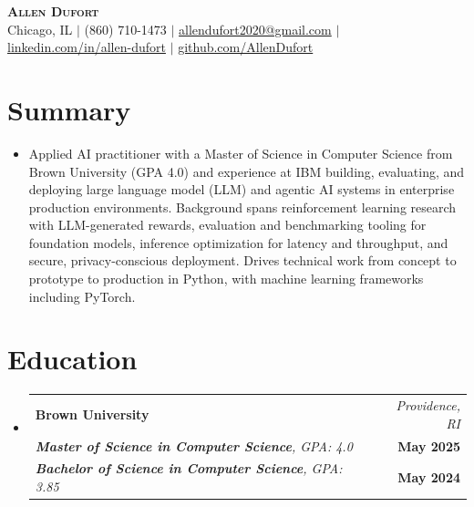 \documentclass[letterpaper,10pt]{article}
\makeatletter
\newcommand{\resumeEdHeading}[6]{
  \item
  \begin{tabular*}{\textwidth}{l@{\extracolsep{\fill}}r}
    \textbf{#1} & \textit{\small #2} \\
    \textit{#3} & \textbf{\small #4} \\
    \textit{#5} & \textbf{\small #6} \\
  \end{tabular*}\vspace{-7pt}
}
\newcommand{\resumeSubHeadingListStart}{\begin{itemize}[leftmargin=0in, label={}]}
\newcommand{\resumeSubHeadingListEnd}{\end{itemize}}
\newcommand{\resumeItemListStart}{\begin{itemize}}
\newcommand{\resumeItemListEnd}{\end{itemize}\vspace{-5pt}}
\makeatother
\begin{document}
\begin{center}
  \textbf{\Huge \scshape Allen Dufort} \\ \vspace{6pt}
  \small
  Chicago, IL $|$
  (860) 710-1473 $|$
  \href{mailto:allendufort2020@gmail.com}{allendufort2020@gmail.com} $|$
  \href{https://www.linkedin.com/in/allen-dufort/}{linkedin.com/in/allen-dufort} $|$
  \href{https://github.com/AllenDufort}{github.com/AllenDufort}
\end{center}

\section{Summary}
\resumeItemListStart[leftmargin=0in, label={}]
  \item\small{
    Applied AI practitioner with a Master of Science in Computer Science from Brown University (GPA 4.0) and experience at IBM building, evaluating, and deploying large language model (LLM) and agentic AI systems in enterprise production environments. Background spans reinforcement learning research with LLM-generated rewards, evaluation and benchmarking tooling for foundation models, inference optimization for latency and throughput, and secure, privacy-conscious deployment. Drives technical work from concept to prototype to production in Python, with machine learning frameworks including PyTorch.
  }
\resumeItemListEnd

\section{Education}
\resumeSubHeadingListStart
  \resumeEdHeading
    {Brown University}{Providence, RI}
    {\textbf{Master of Science in Computer Science}, GPA: 4.0}{May 2025}
    {\textbf{Bachelor of Science in Computer Science}, GPA: 3.85}{May 2024}
\resumeSubHeadingListEnd

\end{document}
